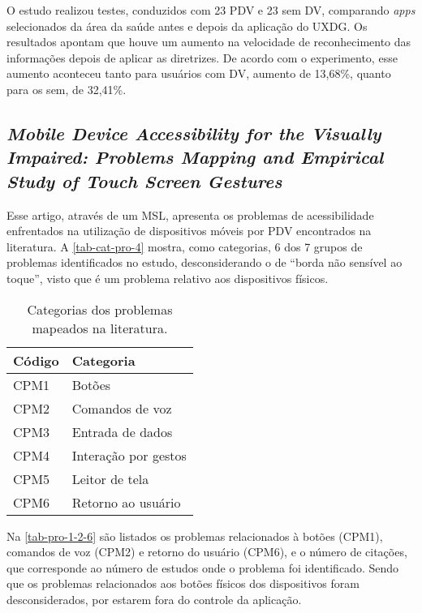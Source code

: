 O estudo realizou testes, conduzidos com 23 PDV e 23 sem DV, comparando \emph{apps} selecionados da área da saúde antes e depois da aplicação do UXDG\@.
Os resultados apontam que houve um aumento na velocidade de reconhecimento das informações depois de aplicar as diretrizes.
De acordo com o experimento, esse aumento aconteceu tanto para usuários com DV, aumento de 13,68\%, quanto para os sem, de 32,41\%.

\subsection{\emph{Mobile Device Accessibility for the Visually Impaired: Problems Mapping and Empirical Study of Touch Screen Gestures}}

Esse artigo, através de um MSL, apresenta os problemas de acessibilidade enfrentados na utilização de dispositivos móveis por PDV encontrados na literatura.
A \autoref{tab-cat-pro-4} mostra, como categorias, 6 dos 7 grupos de problemas identificados no estudo,
desconsiderando o de ``borda não sensível ao toque'', visto que é um problema relativo aos dispositivos físicos.

\begin{table}[htb]
  \begin{center}
    \ABNTEXfontereduzida
    \caption{Categorias dos problemas mapeados na literatura.}
    \label{tab-cat-pro-4}
    \begin{tabular}{p{2.0cm}|p{5.0cm}}
      \textbf{Código} & \textbf{Categoria}   \\
      \hline
      CPM1            & Botões               \\
      \hline
      CPM2            & Comandos de voz      \\
      \hline
      CPM3            & Entrada de dados     \\
      \hline
      CPM4            & Interação por gestos \\
      \hline
      CPM5            & Leitor de tela       \\
      \hline
      CPM6            & Retorno ao usuário   \\
    \end{tabular}
  \end{center}
\end{table}

Na \autoref{tab-pro-1-2-6} são listados os problemas relacionados à botões (CPM1), comandos de voz (CPM2) e retorno do usuário (CPM6), e o número de citações, que corresponde ao número de estudos onde o problema foi identificado.
Sendo que os problemas relacionados aos botões físicos dos dispositivos foram desconsiderados, por estarem fora do controle da aplicação.

